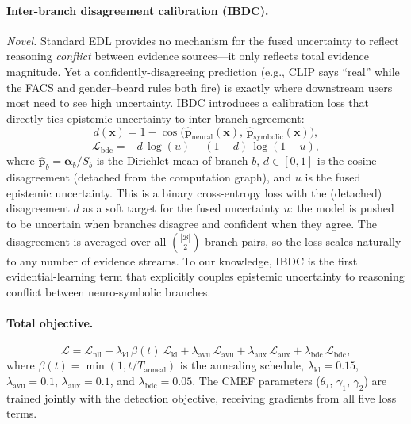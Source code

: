 \documentclass{article}
\begin{document}
\paragraph{Inter-branch disagreement calibration (IBDC).}
\emph{Novel.} Standard EDL provides no mechanism for the fused uncertainty to reflect reasoning \emph{conflict} between evidence sources---it only reflects total evidence magnitude. Yet a confidently-disagreeing prediction (e.g., CLIP says ``real'' while the FACS and gender--beard rules both fire) is exactly where downstream users most need to see high uncertainty. IBDC introduces a calibration loss that directly ties epistemic uncertainty to inter-branch agreement:
\begin{equation}
  d(\bm{x}) = 1 - \cos\bigl(\hat{\bm{p}}_\text{neural}(\bm{x}),\, \hat{\bm{p}}_\text{symbolic}(\bm{x})\bigr),
  \label{eq:disagreement}
\end{equation}
\begin{equation}
  \mathcal{L}_\text{bdc} = -d\,\log(u) - (1{-}d)\,\log(1{-}u),
  \label{eq:ibdc}
\end{equation}
where $\hat{\bm{p}}_b = \bm{\alpha}_b / S_b$ is the Dirichlet mean of branch $b$, $d \in [0, 1]$ is the cosine disagreement (detached from the computation graph), and $u$ is the fused epistemic uncertainty.
This is a binary cross-entropy loss with the (detached) disagreement $d$ as a soft target for the fused uncertainty $u$: the model is pushed to be uncertain when branches disagree and confident when they agree. The disagreement is averaged over all $\binom{|\mathcal{B}|}{2}$ branch pairs, so the loss scales naturally to any number of evidence streams. To our knowledge, IBDC is the first evidential-learning term that explicitly couples epistemic uncertainty to reasoning conflict between neuro-symbolic branches.

\paragraph{Total objective.}
\begin{equation}
  \mathcal{L} = \mathcal{L}_\text{nll}
    + \lambda_\text{kl}\,\beta(t)\,\mathcal{L}_\text{kl}
    + \lambda_\text{avu}\,\mathcal{L}_\text{avu}
    + \lambda_\text{aux}\,\mathcal{L}_\text{aux}
    + \lambda_\text{bdc}\,\mathcal{L}_\text{bdc},
  \label{eq:total_loss}
\end{equation}
where $\beta(t) = \min(1, t/T_\text{anneal})$ is the annealing schedule, $\lambda_\text{kl}{=}0.15$, $\lambda_\text{avu}{=}0.1$, $\lambda_\text{aux}{=}0.1$, and $\lambda_\text{bdc}{=}0.05$.
The CMEF parameters ($\theta_\tau$, $\gamma_1$, $\gamma_2$) are trained jointly with the detection objective, receiving gradients from all five loss terms.
\end{document}
